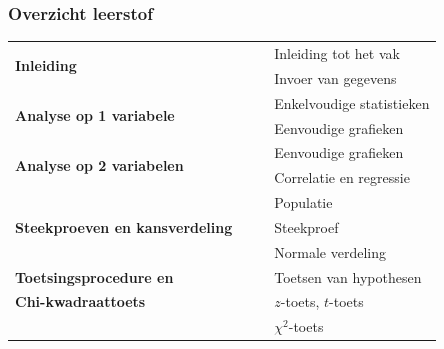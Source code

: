 \documentclass{beamer}
\newcommand{\tabitem}{~~\llap{\textbullet}~~}
\begin{document}
\begin{frame}
  \frametitle{Overzicht leerstof}

\begin{table}[h]
\begin{tabular}{l|l}
  \multirow{2}{*}{\textbf{Inleiding}} &
     \tabitem Inleiding tot het vak \\
   & \tabitem Invoer van gegevens \\

  \hline
  \multirow{2}{*}{\textbf{Analyse op 1 variabele}} &
      \tabitem Enkelvoudige statistieken \\
    & \tabitem Eenvoudige grafieken\\

  \hline
  \multirow{2}{*}{\textbf{Analyse op 2 variabelen}} &
      \tabitem Eenvoudige grafieken \\
    & \tabitem Correlatie en regressie\\

  \hline
  \multirow{3}{*}{\textbf{Steekproeven en kansverdeling}} &
      \tabitem Populatie\\
    & \tabitem Steekproef\\
    & \tabitem Normale verdeling\\

  \hline
  \textbf{Toetsingsprocedure en} & \tabitem Toetsen van hypothesen \\
  \textbf{Chi-kwadraattoets}     & \tabitem $z$-toets, $t$-toets\\
                                 & \tabitem $\chi^{2}$-toets\\

\end{tabular}
\end{table}
\end{frame}
\end{document}
